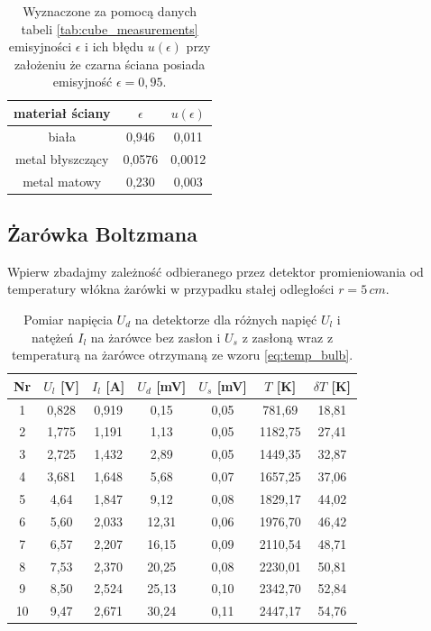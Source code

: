 \documentclass[12pt]{article}
\begin{document}
\begin{table}[H]
    \centering
    \begin{tabular}{c|cc}
        \toprule
        materiał ściany & $\epsilon$ & $u(\epsilon)$ \\
        \midrule
        biała & 0{,}946 & 0{,}011 \\
        metal błyszczący  & 0{,}0576 & 0{,}0012 \\
        metal matowy & 0{,}230 & 0{,}003 \\
        \bottomrule
    \end{tabular}
    \caption{Wyznaczone za pomocą danych tabeli \ref{tab:cube_measurements} emisyjności $\epsilon$ i ich błędu $u(\epsilon)$ przy założeniu że czarna ściana posiada emisyjność $\epsilon = 0{,}95$.}
    \label{tab:materials_emisity}
\end{table}


\subsection{Żarówka Boltzmana}

Wpierw zbadajmy zależność odbieranego przez detektor promieniowania od temperatury włókna żarówki w przypadku stałej odległości $r = 5 \, cm$.
\begin{table}[H]
    \centering
    \begin{tabular}{c|cc|c|c|cc}
        \toprule
        Nr & $U_{l}$ [V] & $I_{l}$ [A] & $U_{d}$ [mV] & $U_{s}$ [mV] & $T$ [K] & $\delta T$ [K] \\
        \midrule
        1  & 0{,}828 & 0{,}919 & 0{,}15 & 0{,}05 & 781{,}69 & 18{,}81 \\
        2  & 1{,}775 & 1{,}191 & 1{,}13 & 0{,}05 & 1182{,}75 & 27{,}41 \\
        3  & 2{,}725 & 1{,}432 & 2{,}89 & 0{,}05 & 1449{,}35 & 32{,}87 \\
        4  & 3{,}681 & 1{,}648 & 5{,}68 & 0{,}07 & 1657{,}25 & 37{,}06 \\
        5  & 4{,}64  & 1{,}847 & 9{,}12 & 0{,}08 & 1829{,}17 & 44{,}02 \\
        6  & 5{,}60  & 2{,}033 & 12{,}31 & 0{,}06 & 1976{,}70 & 46{,}42 \\
        7  & 6{,}57  & 2{,}207 & 16{,}15 & 0{,}09 & 2110{,}54 & 48{,}71 \\
        8  & 7{,}53  & 2{,}370 & 20{,}25 & 0{,}08 & 2230{,}01 & 50{,}81 \\
        9  & 8{,}50  & 2{,}524 & 25{,}13 & 0{,}10 & 2342{,}70 & 52{,}84 \\
        10 & 9{,}47  & 2{,}671 & 30{,}24 & 0{,}11 & 2447{,}17 & 54{,}76 \\
        \bottomrule
    \end{tabular}
    \caption{Pomiar napięcia $U_d$ na detektorze dla różnych napięć $U_l$ i natężeń $I_l$ na żarówce bez zasłon i $U_s$ z zasłoną wraz z temperaturą na żarówce otrzymaną ze wzoru \eqref{eq:temp_bulb}.}
    \label{tab:temp_measurements}
\end{table}
\end{document}
